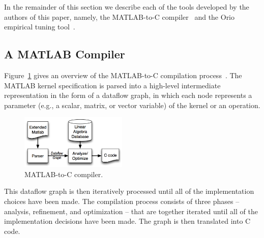 \documentclass[runningheads]{llncs}
\begin{document}

In the remainder of this section we describe each of the tools developed by
the authors of this paper, namely, the MATLAB-to-C compiler~\cite{Siek} and the Orio
empirical tuning tool~\cite{Norris:2007,Hartono:IPDPS09}.

\subsection{A MATLAB Compiler}
\label{sec:matlab}

Figure~\ref{fig:compiler} gives an overview of the MATLAB-to-C compilation process~\cite{Siek}. 
The MATLAB kernel specification is parsed into a high-level intermediate
representation in the form of a dataflow graph, in which each node represents
a parameter (e.g., a scalar, matrix, or vector variable) of the kernel or an operation.
%
\begin{figure}
\centering
\includegraphics[width=2in]{figures/compile.png}
\caption{MATLAB-to-C compiler.}
\label{fig:compiler}
\vspace{-.2in}
\end{figure}
%
This dataflow graph is then iteratively processed until all of
the implementation choices have been made.  The compilation process consists
of three phases -- analysis, refinement, and optimization -- that are together
iterated until all of the implementation decisions have been made.  The graph
is then translated into C code.
\end{document}
